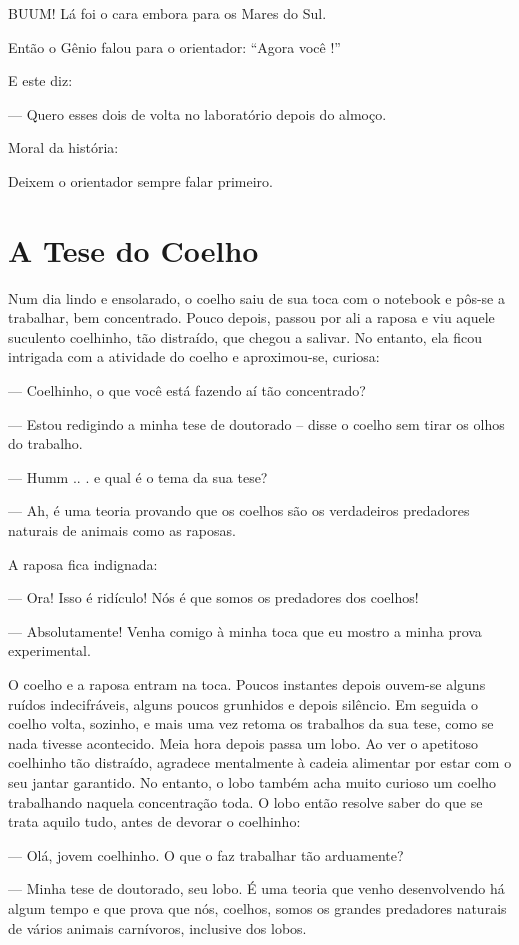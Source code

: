 BUUM! Lá foi o cara embora para os Mares do Sul.

Então o Gênio falou para o orientador: ``Agora você !''

E este diz:

--- Quero esses dois de volta no laboratório depois do almoço.

Moral da história:

Deixem o orientador sempre falar primeiro.

\section{A Tese do Coelho}

Num dia lindo e ensolarado, o coelho saiu de sua toca com o notebook e pôs-se a trabalhar, bem concentrado. Pouco depois, passou por ali a raposa e viu aquele suculento coelhinho, tão distraído, que chegou a salivar. No entanto, ela ficou intrigada com a atividade do coelho e aproximou-se, curiosa:

--- Coelhinho, o que você está fazendo aí tão concentrado?

--- Estou redigindo a minha tese de doutorado -- disse o coelho sem tirar os olhos do trabalho.

--- Humm .. . e qual é o tema da sua tese?

--- Ah, é uma teoria provando que os coelhos são os verdadeiros predadores naturais de animais como as raposas.

A raposa fica indignada:

--- Ora! Isso é ridículo! Nós é que somos os predadores dos coelhos!

--- Absolutamente! Venha comigo à minha toca que eu mostro a minha prova experimental.

O coelho e a raposa entram na toca. Poucos instantes depois ouvem-se alguns ruídos indecifráveis, alguns poucos grunhidos e depois silêncio. Em seguida o coelho volta, sozinho, e mais uma vez retoma os trabalhos da sua tese, como se nada tivesse acontecido. Meia hora depois passa um lobo. Ao ver o apetitoso coelhinho tão distraído, agradece mentalmente à cadeia alimentar por estar com o seu jantar garantido. No entanto, o lobo também acha muito curioso um coelho trabalhando naquela concentração toda. O lobo então resolve saber do que se trata aquilo tudo, antes de devorar o coelhinho:

--- Olá, jovem coelhinho. O que o faz trabalhar tão arduamente?

--- Minha tese de doutorado, seu lobo. É uma teoria que venho desenvolvendo há algum tempo e que prova que nós, coelhos, somos os grandes predadores naturais de vários animais carnívoros, inclusive dos lobos.

